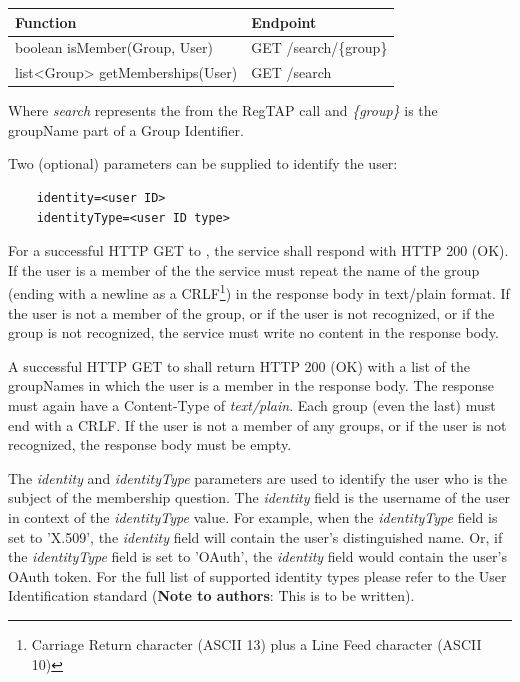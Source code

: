 \documentclass[11pt,a4paper]{ivoa}
\begin{document}
\vspace{3mm}
\begin{tabular}{l l}
\textbf{Function} & \textbf{Endpoint} \\
\hline
boolean isMember(Group, User) & GET /search/\{group\} \\
list<Group> getMemberships(User) & GET /search \\
\hline
\end{tabular}
\vspace{3mm}

Where \emph{search} represents the  from the RegTAP call and \emph{\{group\}} is the groupName part of a Group Identifier.

Two (optional) parameters can be supplied to identify the user:

\begin{verbatim}
    identity=<user ID>
    identityType=<user ID type>
\end{verbatim}

For a successful HTTP GET to , the service shall respond with HTTP 200 (OK).  If the user is a member of the  the service must repeat the name of the group (ending with a newline as a CRLF\footnote{Carriage Return character (ASCII 13) plus a Line Feed character (ASCII 10)}) in the response body in text/plain format.  If the user is not a member of the group, or if the user is not recognized, or if the group is not recognized, the service must write no content in the response body.

A successful HTTP GET to  shall return HTTP 200 (OK) with a list of the groupNames in which the user is a member in the response body.  The response must again have a Content-Type of \emph {text/plain}.  Each group (even the last) must end with a CRLF.  If the user is not a member of any groups, or if the user is not recognized, the response body must be empty.

The \emph{identity} and \emph{identityType} parameters are used to identify the user who is the subject of the membership question.  The \emph{identity} field is the username of the user in context of the \emph{identityType} value.  For example, when the \emph{identityType} field is set to 'X.509', the \emph{identity} field will contain the user's distinguished name.  Or, if the \emph{identityType} field is set to 'OAuth', the \emph{identity} field would contain the user's OAuth token.  For the full list of supported identity types please refer to the User Identification standard (\textbf{Note to authors}: This is to be written).
\end{document}
